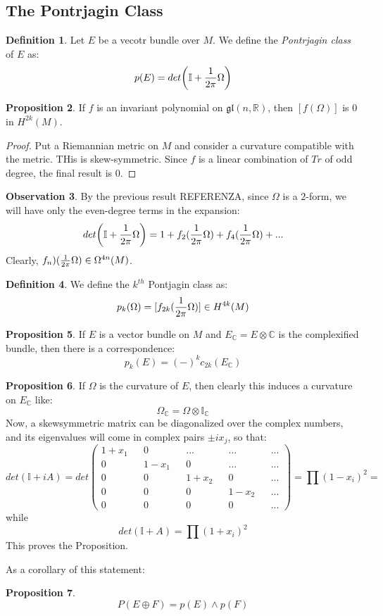 \documentclass[12pt,a4paper]{report}
\theoremstyle{definition}
\newtheorem{Def}{Definition}[chapter]
\theoremstyle{Theorem}
\newtheorem{Prop}[Def]{Proposition}
\theoremstyle{definition}
\theoremstyle{definition}
\newtheorem{Obs}[Def]{Observation}
\begin{document}
	\subsection{The Pontrjagin Class}
		\begin{Def}
			Let $E$ be a vecotr bundle over $M$. We define the \textit{Pontrjagin class} of $E$ as:
			$$p(E)=det\bigg(\mathbb{I}+{1\over 2\pi}\Omega\bigg)$$
		\end{Def}
		\begin{Prop}
			If $f$ is an invariant polynomial on $\mathfrak{gl}(n,\mathbb{R})$, then $[f(\Omega)]$ is 0 in $H^{2k}(M)$.
		\end{Prop}
		\begin{proof}
			Put a Riemannian metric on $M$ and consider a curvature compatible with the metric. THis is skew-symmetric. Since $f$ is a linear combination of $Tr$ of odd degree, the final result is 0.
		\end{proof}
		\begin{Obs}
			By the previous result REFERENZA, since $\Omega$ is a $2$-form, we will have only the even-degree terms in the expansion:
			$$det\bigg(\mathbb{I}+{1\over 2\pi}\Omega\bigg)=1+f_2({1\over 2\pi}\Omega)+f_4({1\over 2\pi}\Omega)+...$$
			Clearly, $f_n)({1\over 2\pi}\Omega)\in\Omega^{4n}(M)$.
		\end{Obs}
		\begin{Def}
			We define the $k^{th}$ Pontjagin class as:
			$$p_k(\Omega)=[f_{2k}({1\over 2\pi}\Omega)]\in H^{4k}(M)$$
		\end{Def}
		\begin{Prop}
			If $E$ is a vector bundle on $M$ and $E_\mathbb{C}=E\otimes \mathbb{C}$ is the complexified bundle, then there is a correspondence:
			$$p_k(E)=(-)^kc_{2k}(E_\mathbb{C})$$
		\end{Prop}
		\begin{Prop}
			If $\Omega$ is the curvature of $E$, then clearly this induces a curvature on $E_\mathbb{C}$ like:
			$$\Omega_\mathbb{C}=\Omega\otimes\mathbb{I}_\mathbb{C}$$
			Now, a skewsymmetric matrix can be diagonalized over the complex numbers, and its eigenvalues will come in complex pairs $\pm ix_j$, so that:
			$$det(\mathbb{I}+iA)=det\begin{pmatrix}
				1+x_1 && 0 && ... &&... && ...\\
				0 && 1-x_1 && 0 && ... && ...  \\
				0 && 0 && 1+x_2 && 0 &&...  \\
				0 && 0 && 0 && 1-x_2 &&...  \\
				0 && 0 && 0 && 0 &&... 
			\end{pmatrix}=\prod (1-x_i)^2=$$
			while
			$$det(\mathbb{I}+A)=\prod (1+x_i)^2$$
			This proves the Proposition.
		\end{Prop}
		As a corollary of this statement:
		\begin{Prop}
			$$P(E\oplus F)=p(E)\wedge p(F)$$
		\end{Prop}
\end{document}
